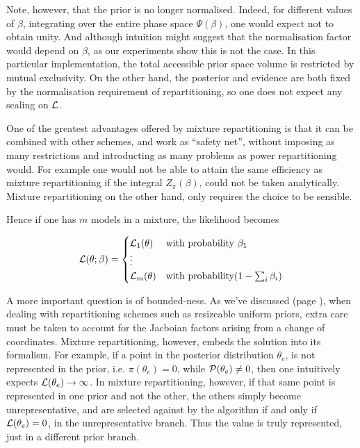 \documentclass[usenatbib]{mnras}
\begin{document}
Note, however, that the prior is no longer normalised. Indeed, for
different values of \(\beta\), integrating over the entire phase
space \(\Psi(\beta)\), one would expect not to obtain unity. And
although intuition might suggest that the normalisation factor
would depend on \(\beta\), as our experiments show this is not the
case. In this particular implementation, the total accessible
prior space volume is restricted by mutual exclusivity. On the
other hand, the posterior and evidence are both fixed by the
normalisation requirement of repartitioning, so one does not
expect any scaling on \({\cal L}\). 

One of the greatest advantages offered by mixture repartitioning
is that it can be combined with other schemes, and work as
``safety net'', without imposing as many restrictions and
introducting as many problems as power repartitioning would. For
example one would not be able to attain the same efficiency as
mixture repartitioning if the integral \(Z_{\pi}(\beta)\), could not
be taken analytically. Mixture repartitioning on the other hand,
only requires the choice to be sensible.

Hence if one has \(m\) models in a mixture, the likelihood becomes 

\begin{equation}
  {\cal L}(\theta; \beta)  = \begin{cases}
	{\cal L}_{1}(\theta) & \text{with probability } \beta_{1}\\
    \vdots\\
	{\cal L}_{m}(\theta) & \text{with probability} (1- \sum_{i}\beta_{i})
	\end{cases}
\end{equation}


A more important question is of bounded-ness. As we've discussed
(page \pageref{domain-discussion}), when dealing with repartitioning
schemes such as resizeable uniform priors, extra care must be
taken to account for the Jacboian factors arising from a change of
coordinates. Mixture repartitioning, however, embeds the solution
into its formalism. For example, if a point in the posterior
distribution \(\theta_{e}\), is not represented in the prior, i.e.
\(\pi(\theta_{e}) = 0\), while \({\cal P}(\theta_{e}) \ne 0\), then
one intuitively expects \({\cal L}(\theta_{e}) \rightarrow
	\infty\). In mixture repartitioning, however, if that same point is
represented in one prior and not the other, the others simply
become unrepresentative, and are selected against by the algorithm
if and only if \({\cal L}(\theta_{e}) = 0\), in the unrepresentative
branch. Thus the value is truly represented, just in a different
prior branch.
\end{document}
